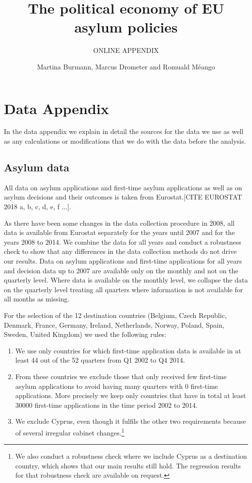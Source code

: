 \documentclass[11pt,a4paper]{scrartcl}
\begin{document}
	\title{The political economy of EU asylum policies}
	\subtitle{ONLINE APPENDIX}
	\author{Martina Burmann, Marcus Drometer and Romuald Méango}
	\maketitle

\tableofcontents

\clearpage
\FloatBarrier
\section{Data Appendix}
In the data appendix we explain in detail the sources for the data we use as well as any calculations or modifications that we do with the data before the analysis. 

\subsection{Asylum data}
All data on asylum applications and first-time asylum applications as well as on asylum decisions and their outcomes is taken from Eurostat.[CITE EUROSTAT 2018 a, b, c, d, e, f ...]. 

As there have been some changes in the data collection procedure in 2008, all data is available from Eurostat separately for the years until 2007 and for the years 2008 to 2014. We combine the data for all years and conduct a robustness check to show that any differences in the data collection methods do not drive our results. Data on asylum applications and first-time applications for all years and decision data up to 2007 are available only on the monthly and not on the quarterly level. Where data is available on the monthly level, we collapse the data on the quarterly level treating all quarters where information is not available for all months as missing. 

For the selection of the 12 destination countries (Belgium, Czech Republic, Denmark, France, Germany, Ireland, Netherlands, Norway, Poland, Spain, Sweden, United Kingdom) we used the following rules:
\begin{enumerate}
	\item We use only countries for which first-time application data is available in at least 44 out of the 52 quarters from Q1 2002 to Q4 2014.
	\item From these countries we exclude those that only received few first-time asylum applications to avoid having many quarters with 0 first-time applications. More precisely we keep only countries that have in total at least 30000 first-time applications in the time period 2002 to 2014.
	\item We exclude Cyprus, even though it fulfils the other two requirements because of several irregular cabinet changes.\footnote{We also conduct a robustness check where we include Cyprus as a destination country, which shows that our main results still hold. The regression results for that robustness check are available on request.}
\end{enumerate}   
\end{document}
